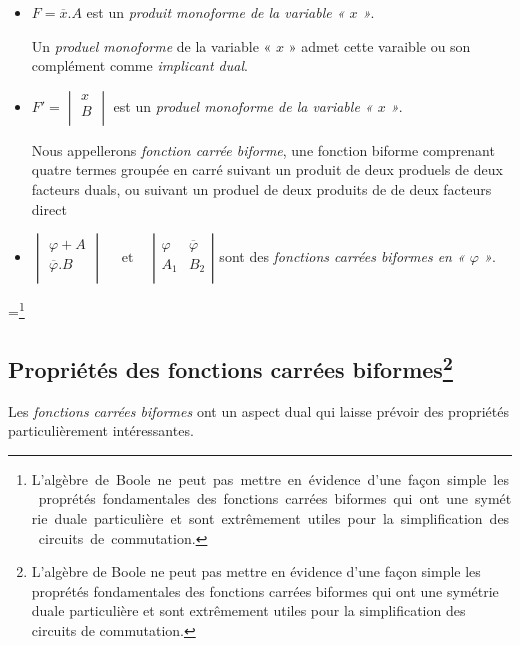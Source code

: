 \begin{itemize}
\item $ F = \overline{x} . A $ est un \textsl{produit monoforme de la variable « $x$ »}. 

Un \textsl{produel monoforme} de la variable « $x$ » admet cette varaible ou son complément comme \textsl{implicant dual}.

\item $F' = \begin{vmatrix}
x \\ B \\
\end{vmatrix}$  est un \textsl{produel monoforme de la variable « $x$ »}. 

Nous appellerons \textsl{fonction carrée biforme}, une fonction biforme comprenant quatre termes groupée en carré suivant un produit de deux produels de deux facteurs duals, ou suivant un produel de deux produits de de deux facteurs direct 

\bigskip

\item   $  \begin{vmatrix}  {\varphi} + A  \\
                                 \overline{ \varphi} . B  \\
                               \end{vmatrix}
                                \quad \text{ et } \quad  
                                \left| \begin{array}{c|c} \varphi  & \overline{\varphi}\\ A_1 & B_2 \\
\end{array} \right| $ sont des \textsl{fonctions carrées biformes en « $\varphi$ »}.
 
\end{itemize} 

=\hbox{\footnote{L'algèbre de {\sc Boole} ne peut pas mettre en évidence d'une façon simple les proprétés fondamentales des fonctions carrées biformes qui ont une symétrie duale particulière et sont extrêmement utiles pour la simplification des circuits de commutation.}}


\subsection{Propriétés des fonctions carrées biformes\protect\footnote{L'algèbre de {\sc Boole} ne peut pas mettre en évidence d'une façon simple les proprétés fondamentales des fonctions carrées biformes qui ont une symétrie duale particulière et sont extrêmement utiles pour la simplification des circuits de commutation.} } Les \textsl{fonctions  carrées biformes} ont un aspect dual qui laisse prévoir des propriétés particulièrement intéressantes.

